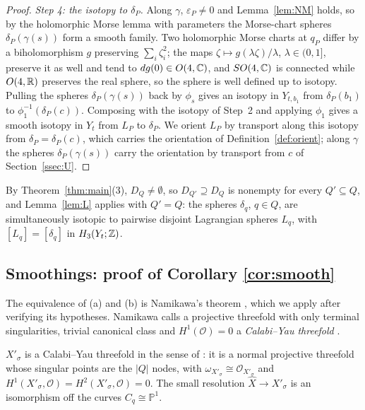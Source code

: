 \begin{proof}
\emph{Step 4: the isotopy to $\delta_P$.} Along $\gamma$, $\varepsilon_P\ne0$ and Lemma~\ref{lem:NM} holds, so by the
holomorphic Morse lemma with parameters the Morse-chart spheres $\delta_P(\gamma(s))$ form a smooth family. Two holomorphic
Morse charts at $q_P$ differ by a biholomorphism $g$ preserving $\sum_i\zeta_i^2$; the maps $\zeta\mapsto g(\lambda\zeta)/\lambda$,
$\lambda\in(0,1]$, preserve it as well and tend to $dg(0)\in O(4,\mathbb C)$, and $SO(4,\mathbb C)$ is connected while $O(4,\mathbb R)$ preserves
the real sphere, so the sphere is well defined up to isotopy. Pulling the spheres $\delta_P(\gamma(s))$ back by $\phi_s$
gives an isotopy in $Y_{t,b_1}$ from $\delta_P(b_1)$ to $\phi_1^{-1}(\delta_P(c))$. Composing with the isotopy of Step~2
and applying $\phi_1$ gives a smooth isotopy in $Y_t$ from $L_P$ to $\delta_P$. We orient $L_P$ by transport along
this isotopy from $\delta_P=\delta_P(c)$, which carries the orientation of Definition~\ref{def:orient}; along $\gamma$ the
spheres $\delta_P(\gamma(s))$ carry the orientation by transport from $c$ of Section~\ref{ssec:U}.
\end{proof}

By Theorem~\ref{thm:main}(3), $D_Q\neq\emptyset$, so $D_{Q'}\supseteq D_Q$ is nonempty for every $Q'\subseteq Q$, and
Lemma~\ref{lem:L} applies with $Q'=Q$: the spheres $\delta_q$, $q\in Q$, are simultaneously isotopic to pairwise disjoint
Lagrangian spheres $L_q$, with $[L_q]=[\delta_q]$ in $H_3(Y_t;\mathbb Z)$.

\subsection{Smoothings: proof of Corollary \texorpdfstring{\ref{cor:smooth}}{B}}\label{ssec:smooth}

The equivalence of (a) and (b) is Namikawa's theorem \cite[Thm.~2.5]{Nam02}, which we apply after verifying its
hypotheses. Namikawa calls a projective threefold with only terminal singularities, trivial canonical class and
$H^1(\mathcal O)=0$ a \emph{Calabi--Yau threefold} \cite[\S0.2]{Nam02}.

\begin{lemma}\label{lem:Xprime}
$X'_\sigma$ is a Calabi--Yau threefold in the sense of \cite{Nam02}: it is a normal projective threefold whose singular
points are the $|Q|$ nodes, with $\omega_{X'_\sigma}\cong\mathcal O_{X'_\sigma}$ and
$H^1(X'_\sigma,\mathcal O)=H^2(X'_\sigma,\mathcal O)=0$. The small resolution $\widehat X\to X'_\sigma$ is an isomorphism off the
curves $C_q\cong\mathbb P^1$.
\end{lemma}

